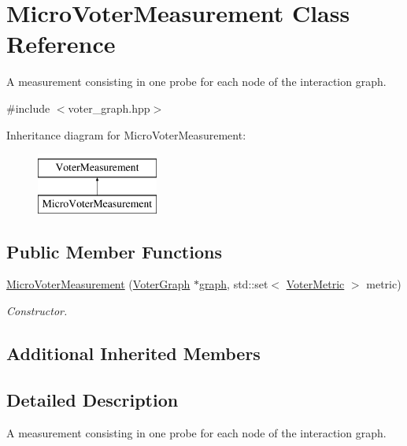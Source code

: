 \hypertarget{class_micro_voter_measurement}{\section{Micro\-Voter\-Measurement Class Reference}
\label{class_micro_voter_measurement}
}


A measurement consisting in one probe for each node of the interaction graph.  




{\ttfamily \#include $<$voter\-\_\-graph.\-hpp$>$}

Inheritance diagram for Micro\-Voter\-Measurement\-:\begin{figure}[H]
\begin{center}
\leavevmode
\includegraphics[height=2.000000cm]{class_micro_voter_measurement}
\end{center}
\end{figure}
\subsection*{Public Member Functions}
\begin{DoxyCompactItemize}
\item 
\hyperlink{class_micro_voter_measurement_a5ab772e26666d7ddf100a0cfea95afee}{Micro\-Voter\-Measurement} (\hyperlink{class_voter_graph}{Voter\-Graph} $\ast$\hyperlink{class_voter_measurement_a8d22d4b78f7e2f4c747f5716c4885351}{graph}, std\-::set$<$ \hyperlink{voter__graph_8hpp_acb4c45a5ce4a55eee28e54e60409b9c5}{Voter\-Metric} $>$ metric)
\begin{DoxyCompactList}\small\item\em Constructor. \end{DoxyCompactList}\end{DoxyCompactItemize}
\subsection*{Additional Inherited Members}


\subsection{Detailed Description}
A measurement consisting in one probe for each node of the interaction graph. 

